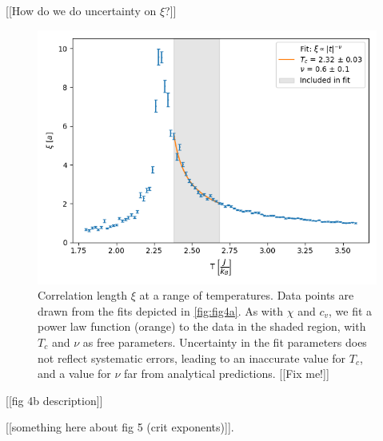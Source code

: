 \documentclass[letter,scriptaddress,twocolumn, prl,nofootinbib]{revtex4}
\begin{document}
[[How do we do uncertainty on $\xi$?]]

\begin{figure}[h]
	\begin{center}
		\includegraphics[width=.5\textwidth]{figs/fig4_xi.png}
		\caption{Correlation length $\xi$ at a range of temperatures. Data points are drawn from the fits depicted in \autoref{fig:fig4a}. As with $\chi$ and $c_v$, we fit a power law function (orange) to the data in the shaded region, with $T_c$ and $\nu$ as free parameters. Uncertainty in the fit parameters does not reflect systematic errors, leading to an inaccurate value for $T_c$, and a value for $\nu$ far from analytical predictions. [[Fix me!]]}
		\label{fig:fig4b}
	\end{center}
\end{figure}

[[fig 4b description]]

[[something here about fig 5 (crit exponents)]].
\end{document}
